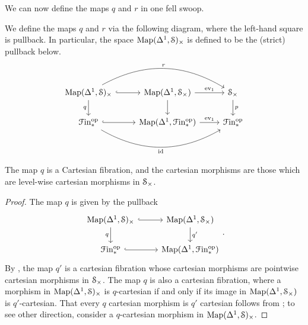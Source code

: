 \documentclass[main.tex]{subfiles}
\begin{document}
We can now define the maps $q$ and $r$ in one fell swoop.
\begin{definition}
  We define the maps $q$ and $r$ via the following diagram, where the left-hand square is pullback. In particular, the space $\Map(\Delta^{1}, \S)_{\times}$ is defined to be the (strict) pullback below.
  \begin{equation*}
    \begin{tikzcd}
      \Map(\Delta^{1}, \S)_{\times}
      \arrow[r, hook]
      \arrow[rr, bend left, "r"]
      \arrow[d, swap, "q"]
      & \Map(\Delta^{1}, \S_{\times})
      \arrow[r, "\ev_{1}"]
      \arrow[d]
      & \S_{\times}
      \arrow[d, "p"]
      \\
      \Finp\op
      \arrow[r, hook]
      \arrow[rr, bend right, swap, "\id"]
      & \Map(\Delta^{1}, \Finp\op)
      \arrow[r, "\ev_{1}"]
      & \Finp\op
    \end{tikzcd}
  \end{equation*}
\end{definition}

\begin{lemma}
  The map $q$ is a Cartesian fibration, and the cartesian morphisms are those which are level-wise cartesian morphisms in $\S_{\times}$.
\end{lemma}
\begin{proof}
  The map $q$ is given by the pullback
  \begin{equation*}
    \begin{tikzcd}
      \Map(\Delta^{1}, \category{S})_{\times}
      \arrow[r, hook]
      \arrow[d, swap, "q"]
      & \Map(\Delta^{1}, \category{S}_{\times})
      \arrow[d, "q'"]
      \\
      \Finp\op
      \arrow[r, hook]
      & \Map(\Delta^{1}, \Finp\op)
    \end{tikzcd}.
  \end{equation*}
  By \cite[Prop.\ 3.1.2.1]{highertopostheory}, the map $q'$ is a cartesian fibration whose cartesian morphisms are pointwise cartesian morphisms in $\S_{\times}$. The map $q$ is also a cartesian fibration, where a morphism in $\Map(\Delta^{1}, \S)_{\times}$ is $q$-cartesian if and only if its image in $\Map(\Delta^{1}, \S_{\times})$ is $q'$-cartesian. That every $q$ cartesian morphism is $q'$ cartesian follows from \cite[Prop\ 2.4.1.3]{highertopostheory}; to see other direction, consider a $q$-cartesian morphism in $\Map(\Delta^{1}, \S)_{\times}$. 
\end{proof}
\end{document}
